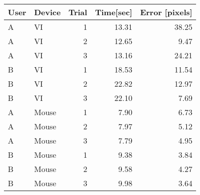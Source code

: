 \begin{tabular}{llrrr}
 \toprule
 User & Device & Trial & Time[sec] & Error [pixels] \\
 \midrule
 A	& VI	  & 1	& 13.31	& 38.25  \\
 A	& VI	  & 2	& 12.65	& 9.47 \\
 A	& VI	  & 3	& 13.16	& 24.21 \\
 B	& VI	  & 1	& 18.53	& 11.54 \\
 B	& VI	  & 2	& 22.82	& 12.97 \\
 B	& VI	  & 3	& 22.10	& 7.69 \\
 A	& Mouse	& 1	& 7.90	& 6.73 \\
 A	& Mouse	& 2	& 7.97	& 5.12 \\
 A	& Mouse	& 3	& 7.79	& 4.95 \\
 B	& Mouse	& 1	& 9.38	& 3.84 \\
 B	& Mouse	& 2	& 9.58	& 4.27 \\
 B	& Mouse	& 3	& 9.98	& 3.64 \\
 \bottomrule
\end{tabular}
